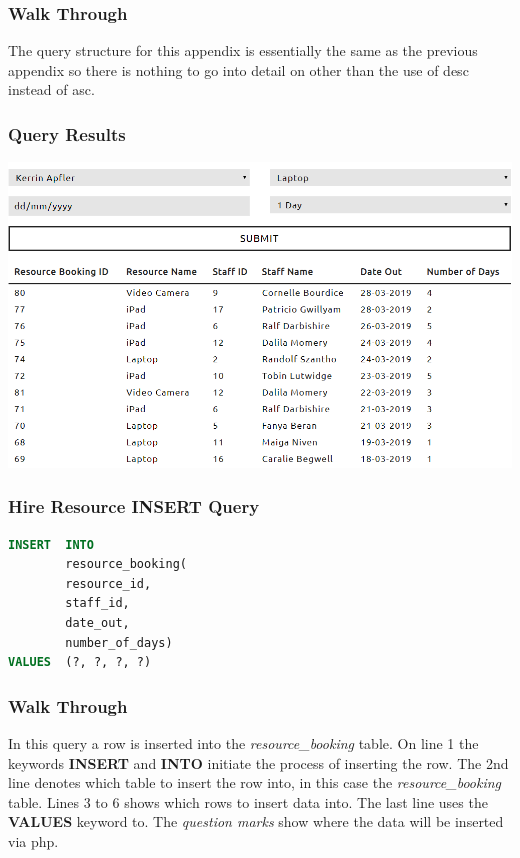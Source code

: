 \documentclass{article}
\begin{document}
\newpage

\subsubsection{Walk Through} The query structure for this appendix is essentially the same as the previous appendix so there is nothing to go into detail on other than the use of \acrfull{desc} instead of \acrfull{asc}.
\subsubsection{Query Results}
\includegraphics[width=\linewidth]{images/03.png}

\subsubsection{Hire Resource INSERT Query}
\begin{lstlisting}[language=sql, caption=Hire Resource INSERT Query, style=mystyle]
INSERT  INTO 
        resource_booking(
        resource_id, 
        staff_id, 
        date_out, 
        number_of_days) 
VALUES  (?, ?, ?, ?)
\end{lstlisting}

\subsubsection{Walk Through} In this query a row is inserted into the \textit{resource\_booking} table. On line 1 the keywords \textbf{INSERT} and \textbf{INTO} initiate the process of inserting the row. The 2nd line denotes which table to insert the row into, in this case the \textit{resource\_booking} table. Lines 3 to 6 shows which rows to insert data into. The last line uses the \textbf{VALUES} keyword to. The \textit{question marks} show where the data will be inserted via \acrshort{php}.
\end{document}
